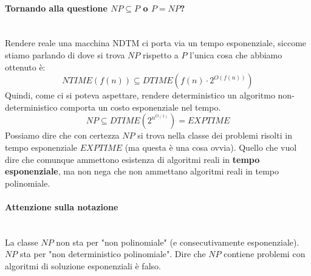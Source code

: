 \documentclass{article}
\begin{document}
\paragraph{Tornando alla questione $NP\subseteq P$ o $P=NP$?}\mbox{}\\
Rendere reale una macchina NDTM ci porta via un tempo esponenziale, siccome stiamo
parlando di dove si trova $NP$ rispetto a $P$ l'unica cosa che abbiamo ottenuto è:
$$NTIME(f(n))\subseteq DTIME(f(n)\cdot 2^{O(f(n))})$$
Quindi, come ci si poteva aspettare, rendere deterministico un algoritmo non-deterministico
comporta un costo esponenziale nel tempo.
$$NP\subseteq DTIME(2^{n^{O(1)}})=EXPTIME$$
Possiamo dire che con certezza $NP$ si trova nella classe dei problemi risolti in
tempo esponenziale $EXPTIME$ (ma questa è una cosa ovvia). Quello che vuol dire che comunque ammettono
esistenza di algoritmi reali in \textbf{tempo esponenziale}, ma non nega che non ammettano algoritmi
reali in tempo polinomiale.

\paragraph{Attenzione sulla notazione}\mbox{}\\
La classe $NP$ non sta per "non polinomiale" (e consecutivamente esponenziale). $NP$
sta per "non deterministico polinomiale". Dire che $NP$ contiene problemi con algoritmi
di soluzione esponenziali è falso.
\end{document}
